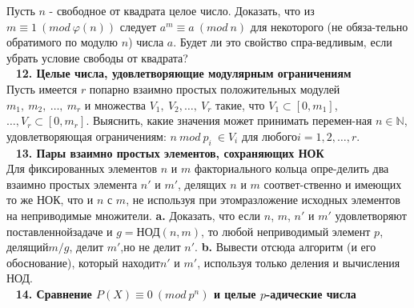 \documentclass{mai_book}
\begin{document}
Пусть $n$ - свободное от квадрата целое число. Доказать, что из\newline $m\equiv1\ (mod\ \varphi(n))$ следует  $a^m\equiv a\ (mod\ n)$ для некоторого (не обяза-\newline тельно обратимого по модулю $n$) числа $a$. Будет ли это свойство спра-\newline ведливым, если убрать условие свободы от квадрата?\\
\ \newline
\noindent\textbf{12. Целые числа, удовлетворяющие модулярным ограничениям}\\

    Пусть имеется $r$ попарно взаимно простых положительных модулей\newline $m_1,\ m_2,\ \ldots,\ m_r$ и множества $V_1,\ V_2, \ldots,\ V_r$ такие, что $V_1\subset [0,m_1]$,\newline $\ldots,V_r\subset[0,m_r].$ Выяснить, какие значения может принимать перемен-\newline ная $n\in \mathbb{N}$, удовлетворяющая ограничениям: $n\ mod\ p_i\ \in V_i$ для любого\newline $i=1,2,\ldots,r.$\\
\ \newline
\noindent\textbf{13. Пары взаимно простых элементов, сохраняющих НОК}\\

    Для фиксированных элементов $n$ и $m$ факториального кольца опре-\newline делить два взаимно простых элемента $n'$ и $m'$, делящих $n$ и $m$ соответ-\newline ственно и имеющих то же НОК, что и $n$ с $m$, не используя при этом\newline разложение исходных элементов на неприводимые множители.\newline
\hspace*{15pt}\textbf{a.} Доказать, что если $n$, $m$, $n'$ и $m'$ удовлетворяют поставленной\newline задаче и $g=\text{НОД}(n,m)$, то любой неприводимый элемент $p$, делящий\newline $m/g$, делит $m'$,но не делит $n'$.\newline
\hspace*{15pt}\textbf{b.} Вывести отсюда алгоритм (и его обоснование), который находит\newline $n'$ и $m'$, используя только деления и вычисления НОД.\\
\ \newline
\noindent\textbf{14. Сравнение $P(X)\equiv0\ (mod\ p^n)$ и целые $p$-адические числа}\\
\end{document}
